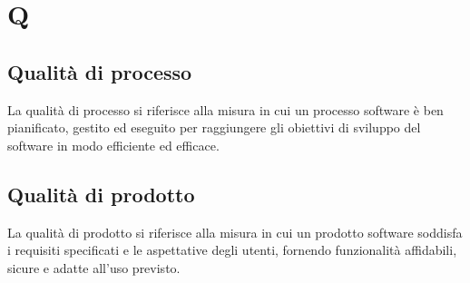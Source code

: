 \section*{Q} 
\subsection*{Qualità di processo} 
La qualità di processo si riferisce alla misura in cui un processo software è ben pianificato, gestito ed eseguito per raggiungere gli obiettivi di sviluppo del software in modo efficiente ed efficace.
\subsection*{Qualità di prodotto} 
La qualità di prodotto si riferisce alla misura in cui un prodotto software soddisfa i requisiti specificati e le aspettative degli utenti, fornendo funzionalità affidabili, sicure e adatte all'uso previsto.
